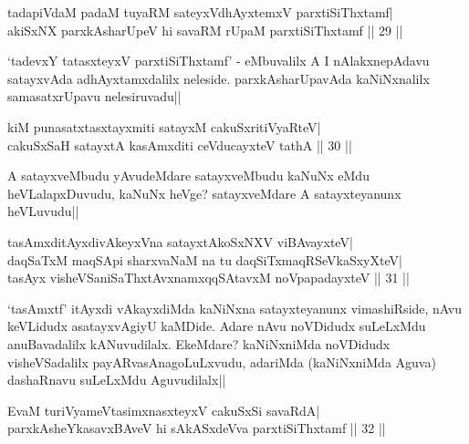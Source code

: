 \stext

\begin{shl}
tadapiVdaM padaM tuyaRM sateyxV\s dhAyxtemxV parxtiSiThxtamf| \\
akiSxNX parxkAsharUpeV hi savaRM rUpaM parxtiSiThxtamf \hfill ||  29 ||
\end{shl}

\begin{artha} 
`tadevxY tatasxteyxV parxtiSiThxtamf' - eMbuvalilx A I nAlakxnepAdavu 
satayxvAda adhAyxtamxdalilx neleside. parxkAsharUpavAda kaNiNxnalilx 
samasatxrUpavu nelesiruvadu||
\end{artha}


\begin{shl}
kiM punasatxtasxtayxmiti satayxM cakuSxritiVyaRteV| \\
cakuSxSaH satayxtA kasAmxditi ceVducayxteV tathA \hfill ||  30 || 
\end{shl}

\begin{artha} 
A satayxveMbudu yAvudeMdare satayxveMbudu kaNuNx eMdu heVLalapxDuvudu, 
kaNuNx heVge? satayxveMdare A satayxteyanunx heVLuvudu||
\end{artha}

\begin{shl}
tasAmxditAyxdivAkeyxVna satayxtA\s koSxNXV viBAvayxteV| \\
daqSaTxM maqSA\s pi sharxvaNaM na tu daqSiTxmaqRSeVkaSxyXteV| \\
tasAyx visheVSaniSaThxtAvxnamxqqSAtavxM noVpapadayxteV \hfill ||  31 || 
\end{shl}

\begin{artha} 
`tasAmxtf' itAyxdi vAkayxdiMda kaNiNxna satayxteyanunx vimashiRside, 
nAvu keVLidudx asatayxvAgiyU kaMDide. Adare nAvu noVDidudx suLeLxMdu 
anuBavadalilx kANuvudilalx. EkeMdare? kaNiNxniMda noVDidudx 
visheVSadalilx payARvasAnagoLuLxvudu, adariMda (kaNiNxniMda Aguva) 
dashaRnavu suLeLxMdu Aguvudilalx||
\end{artha}


\begin{shl}
EvaM turiVyameVtasimxnasxteyxV cakuSxSi savaRdA| \\
parxkAsheYkasavxBAveV hi sAkASxdeVva parxtiSiThxtamf \hfill ||  32 || 
\end{shl}

